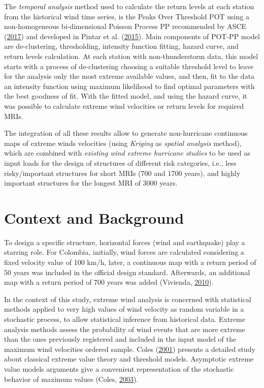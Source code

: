 \documentclass[12pt,oneside]{reedthesis}
\begin{document}
The \emph{temporal analysis} method used to calculate the return levels at each station from the historical wind time series, is the Peaks Over Threshold POT using a non-homogeneous bi-dimensional Poisson Process PP recommended by ASCE (\protect\hyperlink{ref-Asce2017}{2017}) and developed in Pintar et al. (\protect\hyperlink{ref-Pintar2015}{2015}). Main components of POT-PP model are de-clustering, thresholding, intensity function fitting, hazard curve, and return levels calculation. At each station with non-thunderstorm data, this model starts with a process of de-clustering choosing a suitable threshold level to leave for the analysis only the most extreme available values, and then, fit to the data an intensity function using maximum likelihood to find optimal parameters with the best goodness of fit. With the fitted model, and using the hazard curve, it was possible to calculate extreme wind velocities or return levels for required MRIs.

The integration of all these results allow to generate non-hurricane continuous maps of extreme winds velocities (using \emph{Kriging} as \emph{spatial analysis} method), which are combined with \emph{existing wind extreme hurricane studies} to be used as input loads for the design of structures of different risk categories, i.e., less risky/important structures for short MRIs (700 and 1700 years), and highly important structures for the longest MRI of 3000 years.

\hypertarget{context-and-background}{%
\section{Context and Background}\label{context-and-background}}

To design a specific structure, horizontal forces (wind and earthquake) play a starring role. For Colombia, initially, wind forces are calculated considering a fixed velocity value of 100 km/h, later, a continuous map with a return period of 50 years was included in the official design standard. Afterwards, an additional map with a return period of 700 years was added (Vivienda, \protect\hyperlink{ref-nsr10}{2010}).

In the context of this study, extreme wind analysis is concerned with statistical methods applied to very high values of wind velocity as random variable in a stochastic process, to allow statistical inference from historical data. Extreme analysis methods assess the probability of wind events that are more extreme than the ones previously registered and included in the input model of the maximum wind velocities ordered sample. Coles (\protect\hyperlink{ref-Coles2001}{2001}) presents a detailed study about classical extreme value theory and threshold models. Asymptotic extreme value models arguments give a convenient representation of the stochastic behavior of maximum values (Coles, \protect\hyperlink{ref-Coles2003}{2003}).
\end{document}
